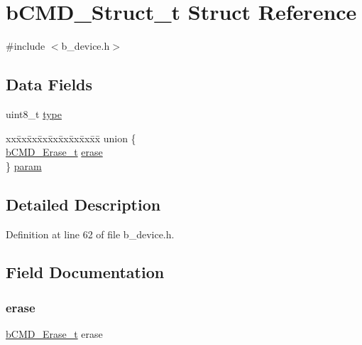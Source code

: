 \hypertarget{structb_c_m_d___struct__t}{}\section{b\+C\+M\+D\+\_\+\+Struct\+\_\+t Struct Reference}
\label{structb_c_m_d___struct__t}


{\ttfamily \#include $<$b\+\_\+device.\+h$>$}

\subsection*{Data Fields}
\begin{DoxyCompactItemize}
\item 
uint8\+\_\+t \mbox{\hyperlink{structb_c_m_d___struct__t_a1d127017fb298b889f4ba24752d08b8e}{type}}
\item 
\begin{tabbing}
xx\=xx\=xx\=xx\=xx\=xx\=xx\=xx\=xx\=\kill
union \{\\
\>\mbox{\hyperlink{structb_c_m_d___erase__t}{bCMD\_Erase\_t}} \mbox{\hyperlink{structb_c_m_d___struct__t_a98946e69cf1ec51d231b3cc2a2b450e1}{erase}}\\
\} \mbox{\hyperlink{structb_c_m_d___struct__t_a7ce465aa898864961d9fcfd902cc61fc}{param}}\\

\end{tabbing}\end{DoxyCompactItemize}


\subsection{Detailed Description}


Definition at line 62 of file b\+\_\+device.\+h.



\subsection{Field Documentation}
\mbox{\label{structb_c_m_d___struct__t_a98946e69cf1ec51d231b3cc2a2b450e1}} 
\subsubsection{\texorpdfstring{erase}{erase}}
{\footnotesize\ttfamily \mbox{\hyperlink{structb_c_m_d___erase__t}{b\+C\+M\+D\+\_\+\+Erase\+\_\+t}} erase}



